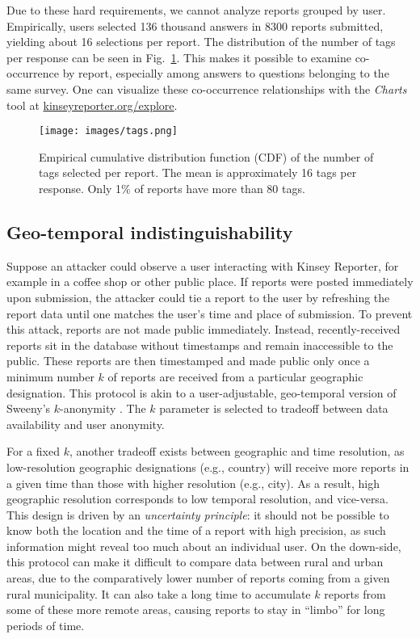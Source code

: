 \documentclass{sigchi}
\begin{document}
Due to these hard requirements, we cannot analyze reports grouped by user. Empirically, users selected 136 thousand answers in 8300 reports submitted, yielding about 16 selections per report. The distribution of the number of tags per response can be seen in Fig.~\ref{fig:cdf-tags}. This makes it possible  to examine co-occurrence by report, especially among answers to questions belonging to the same survey. One can visualize these co-occurrence relationships with the \textit{Charts} tool at \url{kinseyreporter.org/explore}.

\begin{figure}
\texttt{[image: images/tags.png]}
\caption{Empirical cumulative distribution function (CDF) of the number of tags selected per report. The mean is approximately 16 tags per response. Only 1\% of reports have more than 80 tags.}
\label{fig:cdf-tags}
\end{figure}


\subsection{Geo-temporal indistinguishability}

Suppose an attacker could observe a user interacting with Kinsey Reporter, for example in a coffee shop or other public place. If reports were posted immediately upon submission, the attacker could tie a report to the user by refreshing the report data until one matches the user's time and place of submission. To prevent this attack, reports are not made public immediately. Instead, recently-received reports sit in the database without timestamps and remain inaccessible to the public. These reports are then timestamped and made public only once a minimum number $k$ of reports are received from a particular geographic designation.  This protocol is akin to a user-adjustable, geo-temporal version of Sweeny's $k$-anonymity \cite{Sweeny2002}. The $k$ parameter is selected to tradeoff between data availability and user anonymity.

For a fixed $k$, another tradeoff exists between geographic and time resolution, as low-resolution geographic designations (e.g., country) will receive more reports in a given time than those with higher resolution (e.g., city). As a result, high geographic resolution corresponds to low temporal resolution, and vice-versa. This design is driven by an \emph{uncertainty principle}: it should not be possible to know both the location and the time of a report with high precision, as such information might reveal too much about an individual user. On the down-side, this protocol can make it difficult to compare data between rural and urban areas, due to the comparatively lower number of reports coming from a given rural municipality. It can also take a long time to accumulate $k$ reports from some of these more remote areas, causing reports to stay in ``limbo'' for long periods of time.
\end{document}
